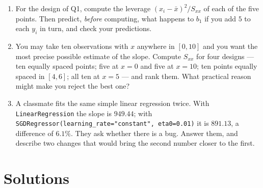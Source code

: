 \documentclass[11pt]{article}
\begin{document}
\begin{enumerate}[leftmargin=*,label=\textbf{Q\arabic*.}]
  \item For the design of Q1, compute the leverage $(x_i-\bar x)^2/S_{xx}$ of
    each of the five points. Then predict, \emph{before} computing, what
    happens to $b_1$ if you add $5$ to each $y_i$ in turn, and check your
    predictions.

  \item You may take ten observations with $x$ anywhere in $[0,10]$ and you
    want the most precise possible estimate of the slope. Compute $S_{xx}$ for
    four designs --- ten equally spaced points; five at $x=0$ and five at
    $x=10$; ten points equally spaced in $[4,6]$; all ten at $x=5$ --- and
    rank them. What practical reason might make you reject the best one?

  \item A classmate fits the same simple linear regression twice. With
    \texttt{LinearRegression} the slope is $949.44$; with
    \texttt{SGDRegressor(learning\_rate="constant", eta0=0.01)} it is
    $891.13$, a difference of $6.1\%$. They ask whether there is a bug.
    Answer them, and describe two changes that would bring the second number
    closer to the first.
\end{enumerate}

\section{Solutions}
\label{sec:solutions}
\end{document}

